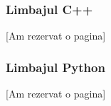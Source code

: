\subsubsection{Limbajul C++}
[Am rezervat o pagina]
\pagebreak




\subsubsection{Limbajul Python}
[Am rezervat o pagina]
\pagebreak











